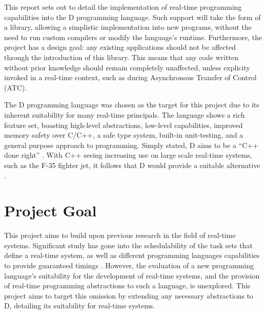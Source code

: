 






This report sets out to detail the implementation of real-time 
programming capabilities into the D programming language. 
Such support will take the form of a library, allowing a simplistic implementation 
into new programs, without the need to run custom compilers or 
modify the language's runtime. Furthermore, the project has a design 
goal: any existing applications should not be affected through the introduction 
of this library. This means that any code written without prior knowledge should 
remain completely unaffected, unless explicity invoked in a real-time context,
such as during Asynchronous Transfer of Control (ATC). 
\par\bigskip\noindent
The D programming language was chosen as the target for this project due to its 
inherent suitability for many real-time principals. The language shows a rich 
feature set, boasting high-level abstractions, low-level capabilities, 
improved memory safety over C/C++, a safe type 
system, built-in unit-testing, and a general purpose approach 
to programming. Simply stated, D aims to be a ``C++ done right'' \cite{qznc-tutorial}. 
With C++ seeing increasing use on large scale real-time systems, such as the F-35 
fighter jet, it follows that D would provide a suitable 
alternative \cite{f35}.
\section{Project Goal} %
This project aims to build upon previous research in the field of real-time systems. 
Significant study has gone into the schedulability of the task sets that 
define a real-time system, as well as different programming languages capabilities 
to provide guaranteed timings \cite{burns-sched-analysis,atc-article}. 
However, the evaluation of a new programming language's suitability for the 
development of real-time systems, and the provision of real-time programming 
abstractions to such a language, is unexplored. 
This project aims to target this omission by extending any necessary 
abstractions to D, detailing its suitability for real-time systems.
